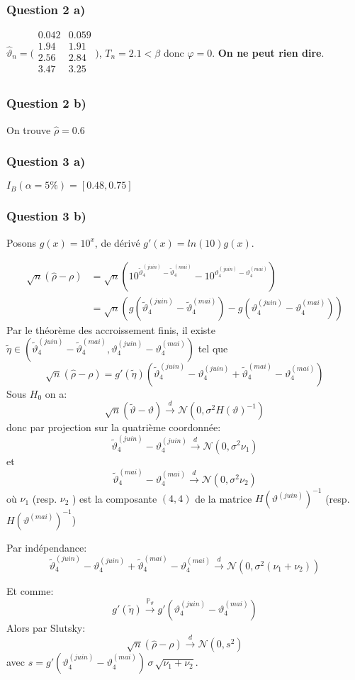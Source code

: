 \documentclass{article}
\newcommand{\BigF}[2]{\ensuremath{#1 \left(#2\right)}}
\newcommand{\Q}[1]{\subsubsection*{Question #1}}
\begin{document}
\Q{2 a) }
$\hat \vartheta_n = 
\bigl(\begin{smallmatrix}
0.042 & 0.059 \\
1.94 & 1.91 \\
2.56 & 2.84 \\
3.47 & 3.25 \\
\end{smallmatrix} \bigr)$,
$T_n = 2.1 < \beta$ donc $\varphi = 0$. \textbf{On ne peut rien dire}.

\Q{2 b)}
On trouve $\hat \rho = 0.6$

\Q{3 a)}
$I_B(\alpha = 5\%) = \left[ 0.48, 0.75 \right] $

\Q{3 b)}
Posons $g(x) = 10^x$, de dérivé $g'(x) = ln(10) g(x)$.

\begin{align*}
\sqrt n (\hat \rho - \rho) 
&= \sqrt n \left( 10^{\tilde \vartheta^{(juin)}_4 -  \tilde \vartheta^{(mai)}_4} - 10^{ \vartheta^{(juin)}_4 - \vartheta^{(mai)}_4} \right) \\
&= \sqrt n \left( \BigF{g}{ \tilde \vartheta^{(juin)}_4 -  \tilde \vartheta^{(mai)}_4 } - \BigF{g}{ \vartheta^{(juin)}_4 - \vartheta^{(mai)}_4} \right)
\end{align*}
Par le théorème des accroissement finis, il existe $\tilde \eta \in \left( \tilde \vartheta^{(juin)}_4 -  \tilde \vartheta^{(mai)}_4, \vartheta^{(juin)}_4 - \vartheta^{(mai)}_4 \right)$ tel que
$$\sqrt n (\hat \rho - \rho) 
= g'( \tilde \eta ) \left(  \tilde \vartheta^{(juin)}_4 - \vartheta^{(juin)}_4 +  \tilde \vartheta^{(mai)}_4  - \vartheta^{(mai)}_4 \right)
$$
Sous $H_0$ on a:
$$ \sqrt n ( \tilde{\vartheta} - \vartheta ) \overset d \longrightarrow \BigF{\mathcal{N}}{0, \sigma^2  \BigF{H}{\vartheta}^{-1}}$$
donc par projection sur la quatrième coordonnée:
$$ \tilde \vartheta^{(juin)}_4 - \vartheta^{(juin)}_4 \overset d \longrightarrow \BigF{\mathcal{N}}{0, \sigma^2 \nu_1}$$
et
$$ \tilde \vartheta^{(mai)}_4 - \vartheta^{(mai)}_4 \overset d \longrightarrow \BigF{\mathcal{N}}{0, \sigma^2 \nu_2}$$
où $\nu_1$ (resp. $\nu_2$ ) est la composante $(4,4)$ de la matrice $H(\vartheta^{(juin)})^{-1}$ (resp. $H(\vartheta^{(mai)})^{-1}$)

Par indépendance:
$$  \tilde \vartheta^{(juin)}_4 - \vartheta^{(juin)}_4 
+ \tilde \vartheta^{(mai)}_4 - \vartheta^{(mai)}_4 
 \overset d \longrightarrow \BigF{\mathcal{N}}{0, \sigma^2 (\nu_1 + \nu_2) }$$

Et comme:
$$  g'( \tilde \eta ) \overset {\mathbb{P}_{\vartheta}} \longrightarrow g'( \vartheta^{(juin)}_4 -  \vartheta^{(mai)}_4)
$$
Alors par Slutsky:
$$ \sqrt n (\hat \rho - \rho)  \overset d \longrightarrow \BigF{\mathcal{N}}{0, s^2 }$$
avec $s = g'( \vartheta^{(juin)}_4 -  \vartheta^{(mai)}_4) \, \sigma \, \sqrt{\nu_1 + \nu_2}$.
\end{document}
